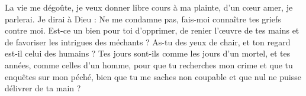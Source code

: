 La vie me dégoûte, je veux donner libre cours à ma plainte, d’un cœur amer, je parlerai.
Je dirai à Dieu : Ne me condamne pas, fais-moi connaître tes griefs contre moi.
Est-ce un bien pour toi d’opprimer, de renier l’œuvre de tes mains et de favoriser les intrigues des méchants ?
As-tu des yeux de chair, et ton regard est-il celui des humains ? Tes jours sont-ils comme les jours d’un mortel, et tes années, comme celles d’un homme, pour que tu recherches mon crime et que tu enquêtes sur mon péché, bien que tu me saches non coupable et que nul ne puisse délivrer de ta main ?
